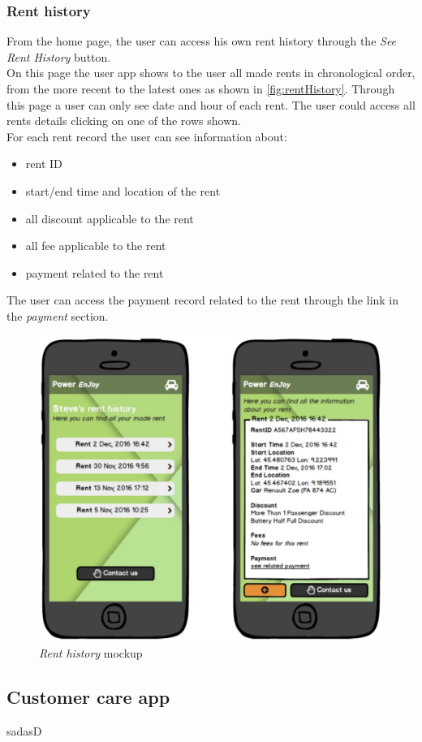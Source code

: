 \clearpage

\subsubsection{Rent history}

From the home page, the user can access his own rent history through the \emph{See Rent History} button. \\

On this page the user app shows to the user all made rents in chronological order, from the more recent to the latest ones as shown in \autoref{fig:rentHistory}. Through this page a user can only see date and hour of each rent. The user could access all rents details clicking on one of the rows shown. \\

For each rent record the user can see information about:
\begin{itemize}
	\item rent ID
	\item start/end time and location of the rent
	\item all discount applicable to the rent
	\item all fee applicable to the rent
	\item payment related to the rent
\end{itemize}

The user can access the payment record related to the rent through the link in the \emph{payment} section.
\\

\begin{figure}[h]
			\centering
			\includegraphics[width=0.9\linewidth]{mockups/rentHistory}
			\caption{
				\label{fig:rentHistory} 
				\emph{Rent history} mockup
			}
		\end{figure}

\clearpage

\subsection{Customer care app}
sadasD